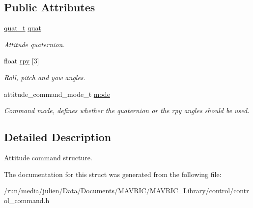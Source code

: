 \subsection*{Public Attributes}
\begin{DoxyCompactItemize}
\item 
\hypertarget{structattitude__command__t_a170ed44b78ac06baef0bd813c346567c}{\hyperlink{structquat__t}{quat\+\_\+t} \hyperlink{structattitude__command__t_a170ed44b78ac06baef0bd813c346567c}{quat}}\label{structattitude__command__t_a170ed44b78ac06baef0bd813c346567c}

\begin{DoxyCompactList}\small\item\em Attitude quaternion. \end{DoxyCompactList}\item 
\hypertarget{structattitude__command__t_a4b05a80c9b476c13217cf95d56ca3ae8}{float \hyperlink{structattitude__command__t_a4b05a80c9b476c13217cf95d56ca3ae8}{rpy} \mbox{[}3\mbox{]}}\label{structattitude__command__t_a4b05a80c9b476c13217cf95d56ca3ae8}

\begin{DoxyCompactList}\small\item\em Roll, pitch and yaw angles. \end{DoxyCompactList}\item 
\hypertarget{structattitude__command__t_acf7102f3c61fcb46c373e58462416a88}{attitude\+\_\+command\+\_\+mode\+\_\+t \hyperlink{structattitude__command__t_acf7102f3c61fcb46c373e58462416a88}{mode}}\label{structattitude__command__t_acf7102f3c61fcb46c373e58462416a88}

\begin{DoxyCompactList}\small\item\em Command mode, defines whether the quaternion or the rpy angles should be used. \end{DoxyCompactList}\end{DoxyCompactItemize}


\subsection{Detailed Description}
Attitude command structure. 

The documentation for this struct was generated from the following file\+:\begin{DoxyCompactItemize}
\item 
/run/media/julien/\+Data/\+Documents/\+M\+A\+V\+R\+I\+C/\+M\+A\+V\+R\+I\+C\+\_\+\+Library/control/control\+\_\+command.\+h\end{DoxyCompactItemize}
